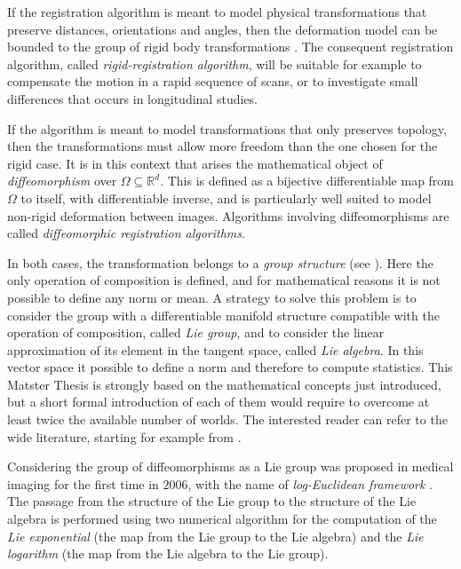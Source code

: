 If the registration algorithm is meant to model physical transformations that preserve distances, orientations and angles, then the deformation model can be bounded to the group of rigid body transformations \cite{gallier2011geometric}. The consequent registration algorithm, called \emph{rigid-registration algorithm}, will be suitable for example to compensate the motion in a rapid sequence of scans, or to investigate small differences that occurs in longitudinal studies.

If the algorithm is meant to model transformations that only preserves topology, then the transformations must allow more freedom than the one chosen for the rigid case. It is in this context that arises the mathematical object of \emph{diffeomorphism} over $\Omega\subseteq \mathbb{R}^{d}$. This is defined as a bijective differentiable map from $\Omega$ to itself, with differentiable inverse, and is particularly well suited to model non-rigid deformation between images. Algorithms involving diffeomorphisms are called \emph{diffeomorphic registration algorithms}.

In both cases, the transformation belongs to a \emph{group structure} (see \cite{artin2011algebra}). Here the only operation of composition is defined, and for mathematical reasons it is not possible to define any norm or mean. A strategy to solve this problem is to consider the group with a differentiable manifold structure compatible with the operation of composition, called \emph{Lie group}, and to consider the linear approximation of its element in the tangent space, called \emph{Lie algebra}. In this vector space it possible to define a norm and therefore to compute statistics. This Matster Thesis is strongly based on the mathematical concepts just introduced, but a short formal introduction of each of them would require to overcome at least twice the available number of worlds. The interested reader can refer to the wide literature, starting for example from \cite{lee2012introduction, arnold2006ordinary, warner, do1976differential}.

Considering the group of diffeomorphisms as a Lie group was proposed in medical imaging for the first time in $2006$, with the name of \emph{log-Euclidean framework} \cite{Arsigny:MRM:06}. The passage from the structure of the Lie group to the structure of the Lie algebra is performed using two numerical algorithm for the computation of the \emph{Lie exponential} (the map from the Lie group to the Lie algebra) and the \emph{Lie logarithm} (the map from the Lie algebra to the Lie group).

